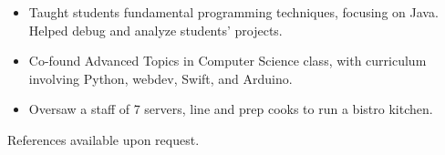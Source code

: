 \documentclass[11pt]{article}
\begin{document}
\vspace{1mm}
{\fontsize{10}{12}\robotocondlight
    \begin{itemize}[noitemsep,nolistsep]
        \item Taught students fundamental programming techniques, focusing on Java. Helped debug and analyze students’ projects. 
        \item Co-found Advanced Topics in Computer Science class, with curriculum involving Python, webdev, Swift, and Arduino. 
    \end{itemize}
    \begin{itemize}[noitemsep,nolistsep]
        \item Oversaw a staff of 7 servers, line and prep cooks to run a bistro kitchen.
    \end{itemize}
    {\fontsize{8}{10}\robotocondlight References available upon request.}
}
\vspace{-5mm}
\hsep
\vspace{-3mm}
\end{document}
